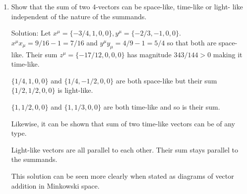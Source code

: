 \begin{enumerate}
\item Show that the sum of two 4-vectors can be space-like, time-like or light-
like independent of the nature of the summands.\cite{pg}
\item[Solution:] Let $x^\mu = \{-3/4, 1, 0, 0\}, y^\mu = \{-2/3, -1, 0, 0\}$.
$x^\mu x_\mu = 9/16 - 1 = 7/16$ and $y^\mu y_\mu = 4/9 - 1 = 5/4$ so that both
are space-like. Their sum $z^\mu = \{-17/12, 0, 0, 0\}$ has magnitude $343/144
> 0$ making it time-like. 

$\{1/4, 1, 0, 0\}$ and $\{1/4, -1/2, 0, 0\}$ are both space-like but their sum
$\{1/2, 1/2, 0, 0\}$ is light-like.

$\{1, 1/2, 0, 0\}$ and $\{1, 1/3, 0, 0\}$ are both time-like and so is their
sum.

Likewise, it can be shown that sum of two time-like vectors can be of any type.

Light-like vectors are all parallel to each other. Their sum stays parallel
to the summands.

This solution can be seen more clearly when stated as diagrams of vector 
addition in Minkowski space.
\end{enumerate}
